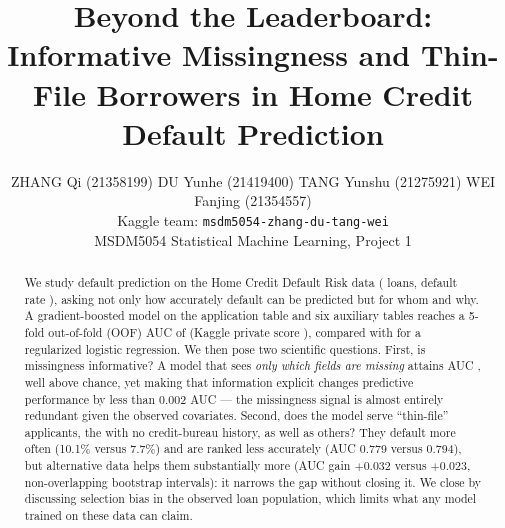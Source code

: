 \documentclass[10pt]{article}
\title{Beyond the Leaderboard: Informative Missingness and Thin-File Borrowers in Home Credit Default Prediction}
\author{ZHANG Qi (21358199) \quad DU Yunhe (21419400) \quad TANG Yunshu (21275921) \quad WEI Fanjing (21354557)\\ Kaggle team: \texttt{msdm5054-zhang-du-tang-wei}\\ MSDM5054 Statistical Machine Learning, Project 1}
\date{}
\begin{document}
\setlength{\abovecaptionskip}{4pt}\setlength{\belowcaptionskip}{4pt}
\setlength{\textfloatsep}{10pt}\setlength{\intextsep}{8pt}
\maketitle

\begin{abstract}
We study default prediction on the Home Credit Default Risk data (\NTrain{} loans, default rate \DefaultRate{}), asking not only how accurately default can be predicted but for whom and why. A gradient-boosted model on the application table and six auxiliary tables reaches a 5-fold out-of-fold (OOF) AUC of \AucLgbAll{} (Kaggle private score \KagglePrivate{}), compared with \AucLogit{} for a regularized logistic regression. We then pose two scientific questions. First, is missingness informative? A model that sees \emph{only which fields are missing} attains AUC \AucIndOnly{}, well above chance, yet making that information explicit changes predictive performance by less than 0.002 AUC --- the missingness signal is almost entirely redundant given the observed covariates. Second, does the model serve ``thin-file'' applicants, the \ThinShare{} with no credit-bureau history, as well as others? They default more often (10.1\% versus 7.7\%) and are ranked less accurately (AUC 0.779 versus 0.794), but alternative data helps them substantially more (AUC gain $+0.032$ versus $+0.023$, non-overlapping bootstrap intervals): it narrows the gap without closing it. We close by discussing selection bias in the observed loan population, which limits what any model trained on these data can claim.
\end{abstract}
\end{document}
